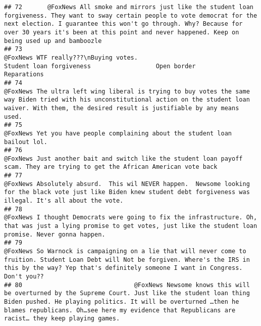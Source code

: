 \documentclass[
]{article}
\begin{document}
\begin{verbatim}
## 72       @FoxNews All smoke and mirrors just like the student loan forgiveness. They want to sway certain people to vote democrat for the next election. I guarantee this won't go through. Why? Because for over 30 years it's been at this point and never happened. Keep on being used up and bamboozle
## 73                                                                                                                                     @FoxNews WTF really???\nBuying votes.                                  Student loan forgiveness                  Open border                            Reparations
## 74                                                                                       @FoxNews The ultra left wing liberal is trying to buy votes the same way Biden tried with his unconstitutional action on the student loan waiver. With them, the desired result is justifiable by any means used.
## 75                                                                                                                                                                                                                            @FoxNews Yet you have people complaining about the student loan bailout lol.
## 76                                                                                                                                                                          @FoxNews Just another bait and switch like the student loan payoff scam. They are trying to get the African American vote back
## 77                                                                                                                             @FoxNews Absolutely absurd.  This wil NEVER happen.  Newsome looking for the black vote just like Biden knew student debt forgiveness was illegal. It's all about the vote.
## 78                                                                                                                              @FoxNews I thought Democrats were going to fix the infrastructure. Oh, that was just a lying promise to get votes, just like the student loan promise. Never gonna happen.
## 79                                                                                 @FoxNews So Warnock is campaigning on a lie that will never come to fruition. Student Loan Debt will Not be forgiven. Where's the IRS in this by the way? Yep that's definitely someone I want in Congress. Don't you??
## 80                               @FoxNews Newsome knows this will be overturned by the Supreme Court. Just like the student loan thing Biden pushed. He playing politics. It will be overturned …then he blames republicans. Oh…see here my evidence that Republicans are racist… they keep playing games.

\end{verbatim}
\end{document}
